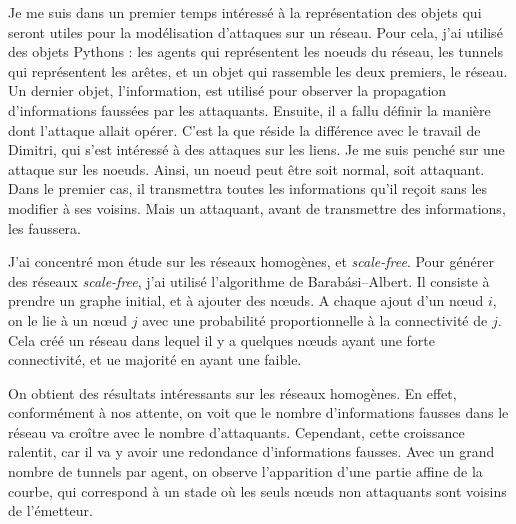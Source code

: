 \documentclass[11pt,a4paper]{article}
\begin{document}
	Je me suis dans un premier temps intéressé à la représentation des objets qui seront utiles pour la modélisation d'attaques sur un réseau.  Pour cela, j'ai utilisé des objets Pythons : les agents qui représentent les noeuds du réseau, les tunnels qui représentent les arêtes, et un objet qui rassemble les deux premiers, le réseau. Un dernier objet, l'information, est utilisé pour observer la propagation d'informations faussées par les attaquants. Ensuite, il a fallu définir la manière dont l'attaque allait opérer. C'est la que réside la différence avec le travail de Dimitri, qui s'est intéressé à des attaques sur les liens. Je me suis penché sur une attaque sur les noeuds. Ainsi, un noeud peut être soit normal, soit attaquant. Dans le premier cas, il transmettra toutes les informations qu'il reçoit sans les modifier à ses voisins. Mais un attaquant, avant de transmettre des informations, les faussera. 
	
\begin{center}
\end{center} 

	J'ai concentré mon étude sur les réseaux homogènes, et \emph{scale-free}. Pour générer des réseaux \emph{scale-free}, j'ai utilisé l'algorithme de Barabási–Albert. Il consiste à prendre un graphe initial, et à ajouter des nœuds. A chaque ajout d'un nœud $i$, on le lie à un nœud $j$ avec une probabilité proportionnelle à la connectivité de $j$. Cela créé un réseau dans lequel il y a quelques nœuds ayant une forte connectivité, et ue majorité en ayant une faible.
	
	
	On obtient des résultats intéressants sur les réseaux homogènes. En effet, conformément à nos attente, on voit que le nombre d'informations fausses dans le réseau va croître avec le nombre d'attaquants. Cependant, cette croissance ralentit, car il va y avoir une redondance d'informations fausses. Avec un grand nombre de tunnels par agent, on observe l'apparition d'une partie affine de la courbe, qui correspond à un stade où les seuls nœuds non attaquants sont voisins de l'émetteur.
	
\end{document}
